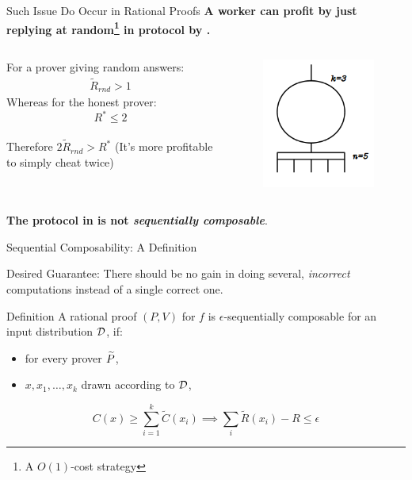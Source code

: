 \begin{frame}[t]{Such Issue Do Occur in Rational Proofs}
\large{\textbf{A worker can profit by just replying at random\footnote{A $O(1)$-cost strategy} in protocol by \cite{am1}.}}
\medskip
\begin{columns}
	For a prover giving random answers:
	\onslide<2->
	\begin{align*}
	\tilde{R}_{rnd} > 1
	\end{align*}
	\onslide<3->
	Whereas for the honest prover:
	\[
	R^* \leq 2
	\]\\
	\medskip
	\onslide<4->
Therefore $2\tilde{R}_{rnd} > R^*$
{(It's more profitable to simply cheat twice)}
	\onslide<1->
	\begin{figure}
		\includegraphics[scale=0.7]{pics/threshold-circ.png}
		
	\end{figure}
\end{columns}
\medskip
	 \textbf{The protocol in \cite{am1} is not \textit{sequentially composable}}.
	\vfill
\end{frame}

\begin{frame}{Sequential Composability: A Definition}

\begin{framed}
\begin{block}{Desired Guarantee:}
	There should be no gain in doing several, \textit{incorrect} computations instead of a single correct one.
\end{block}
\end{framed}
	\bigskip
\pause
	\begin{block}{Definition}
		A rational proof $(P,V)$ for $f$ 
		is $\epsilon$-{\sf sequentially composable} for an input distribution $\cal D$, if:
			\pause
		\begin{itemize}
			\item  for every prover $\widetilde{P}$, 
				\pause
			\item	$x,x_1,\ldots,x_k$ drawn according to ${\cal D}$,
		\end{itemize}
				\pause
		$$C(x) \geq \sum_{i=1}^k 
		\tilde{C}(x_i)\implies \sum_{i}\tilde{R}(x_i) - R \leq \epsilon$$
	\end{block}
\end{frame}


